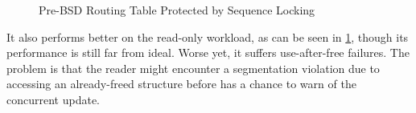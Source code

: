 \begin{figure}
\centering
{}
\caption{Pre-BSD Routing Table Protected by Sequence Locking}
\label{fig:defer:Pre-BSD Routing Table Protected by Sequence Locking}
\end{figure}

It also performs better on the read-only workload, as can be seen in
\cref{fig:defer:Pre-BSD Routing Table Protected by Sequence Locking},
though its performance is still far from ideal.
Worse yet, it suffers use-after-free failures.
The problem is that the reader might encounter a segmentation violation
due to accessing an already-freed structure before 
has a chance to warn of the concurrent update.

